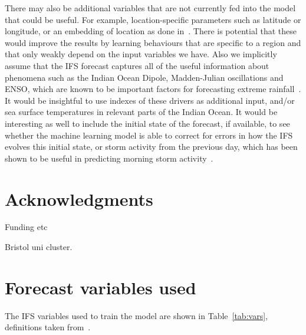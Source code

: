 \documentclass{article}
\begin{document}

There may also be additional variables that are not currently fed into the model that could be useful. For example, location-specific parameters such as latitude or longitude, or an embedding of location as done in~\cite{rasp_neural_2018}. There is potential that these would improve the results by learning behaviours that are specific to a region and that only weakly depend on the input variables we have. Also we implicitly assume that the IFS forecast captures all of the useful information about phenomena such as the Indian Ocean Dipole, Madden-Julian oscillations and ENSO, which are known to be important factors for forecasting extreme rainfall~\citep{wainwright_extreme_2021, palmer_drivers_2023}. It would be insightful to use indexes of these drivers as additional input, and/or sea surface temperatures in relevant parts of the Indian Ocean. It would be interesting as well to include the initial state of the forecast, if available, to see whether the machine learning model is able to correct for errors in how the IFS evolves this initial state, or storm activity from the previous day, which has been shown to be useful in predicting morning storm activity~\citep{thiery_early_2017}. 



\section*{Acknowledgments}

Funding etc

Bristol uni cluster.



\appendix

\section{Forecast variables used}\label{app:fcst_vars}
The IFS variables used to train the model are shown in Table~\ref{tab:vars}, definitions taken from~\citep{ecmwf_parameter_2023}.
\end{document}
